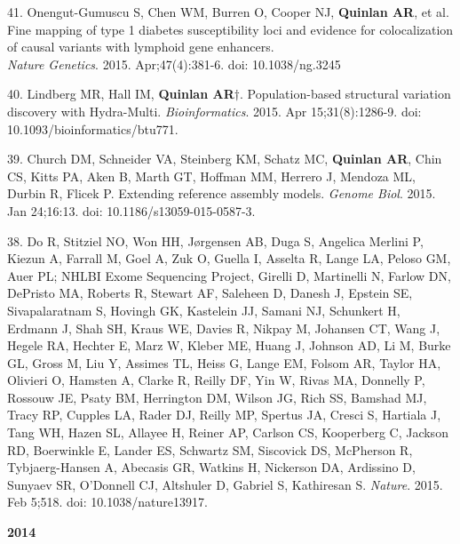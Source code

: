 \documentclass[margin,line]{cv}
\begin{document}
\begin{resume}
\begin{list}{*}{}
    \item[41.] Onengut-Gumuscu S, Chen WM, Burren O, Cooper NJ, \textbf{Quinlan AR}, et al.
    Fine mapping of type 1 diabetes susceptibility loci and evidence for colocalization of causal variants with lymphoid gene enhancers.\\
    \emph{Nature Genetics}. 2015. Apr;47(4):381-6. doi: 10.1038/ng.3245

    \item[40.] Lindberg MR, Hall IM, \textbf{Quinlan AR}$\dagger$.
    Population-based structural variation discovery with Hydra-Multi.
    \emph{Bioinformatics}. 2015. Apr 15;31(8):1286-9. doi: 10.1093/bioinformatics/btu771.

    \item[39.] Church DM, Schneider VA, Steinberg KM, Schatz MC, \textbf{Quinlan AR}, Chin CS, Kitts PA, Aken B, Marth GT,
    Hoffman MM, Herrero J, Mendoza ML, Durbin R, Flicek P.
    Extending reference assembly models.
    \emph{Genome Biol}. 2015. Jan 24;16:13. doi: 10.1186/s13059-015-0587-3.
    
    \item[38.] Do R, Stitziel NO, Won HH, Jørgensen AB, Duga S, Angelica Merlini P, Kiezun A, Farrall M, Goel A, Zuk O, Guella I, Asselta R, Lange LA, Peloso GM, Auer PL; NHLBI Exome Sequencing Project, Girelli D, Martinelli N, Farlow DN, DePristo MA, Roberts R, Stewart AF, Saleheen D, Danesh J, Epstein SE, Sivapalaratnam S, Hovingh GK, Kastelein JJ, Samani NJ, Schunkert H, Erdmann J, Shah SH, Kraus WE, Davies R, Nikpay M, Johansen CT, Wang J, Hegele RA, Hechter E, Marz W, Kleber ME, Huang J, Johnson AD, Li M, Burke GL, Gross M, Liu Y, Assimes TL, Heiss G, Lange EM, Folsom AR, Taylor HA, Olivieri O, Hamsten A, Clarke R, Reilly DF, Yin W, Rivas MA, Donnelly P, Rossouw JE, Psaty BM, Herrington DM, Wilson JG, Rich SS, Bamshad MJ, Tracy RP, Cupples LA, Rader DJ, Reilly MP, Spertus JA, Cresci S, Hartiala J, Tang WH, Hazen SL, Allayee H, Reiner AP, Carlson CS, Kooperberg C, Jackson RD, Boerwinkle E, Lander ES, Schwartz SM, Siscovick DS, McPherson R, Tybjaerg-Hansen A, Abecasis GR, Watkins H, Nickerson DA, Ardissino D, Sunyaev SR, O'Donnell CJ, Altshuler D, Gabriel S, Kathiresan S.
    \emph{Nature}. 2015. Feb 5;518. doi: 10.1038/nature13917.

    \end{list}


    \textbf{2014} \\

    \begin{list}{*}{}


\end{list}
\end{resume}
\end{document}
